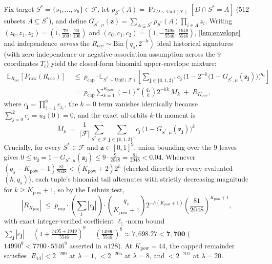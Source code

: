 \documentclass[11pt,a4paper]{article}
\theoremstyle{definition}
\theoremstyle{remark}
\newcommand{\Unif}{\mathrm{Unif}}
\newcommand{\calF}{\mathcal{F}}
\begin{document}
Fix target $S^* = \{s_1, \dots, s_9\} \in \calF$, let $p_{S^*}(A) = \Pr_{D \sim \Unif(\calF)}[D \cap S^* = A]$ ($512$ subsets $A \subseteq S^*$), and define $G_{S^*,\mu}(\mathbf{z}) = \sum_{A \subseteq S^*} p_{S^*}(A) \prod_{i \in A} z_i$. Writing $(z_0, z_1, z_2) = (1, \frac{79}{100}, \frac{20}{100})$ and $(c_0, c_1, c_2) = (1, -\frac{7495}{5546}, \frac{1949}{5546})$, \cref{lem:envelope} and independence \emph{across} the $R_{\mathrm{occ}} \sim \mathrm{Bin}(q_s, 2^{-h})$ ideal historical signatures (with zero independence or negative-association assumption across the $9$ coordinates $T_i$) yield the closed-form binomial upper-envelope mixture:
\begin{align}
\label{eq:exact-binom}
  \mathbb{E}_{R_{\mathrm{occ}}}[P_{\mathrm{raw}}(R_{\mathrm{occ}})]
  &\;\le\; p_{\mathrm{cap}} \cdot \mathbb{E}_{S^* \sim \Unif(\calF)}\!\left[
    \sum_{\mathbf{j} \in \{0,1,2\}^9} c_{\mathbf{j}}\, \Big(1 - 2^{-h}\big(1 - G_{S^*,\mu}(\mathbf{z}_{\mathbf{j}})\big)\Big)^{q_s}
  \right] \nonumber \\
  &\;=\; p_{\mathrm{cap}} \sum_{k=1}^{K_{\mathrm{pow}}} (-1)^k \binom{q_s}{k} 2^{-hk} \, \overline{M}_k \;+\; R_{K_{\mathrm{pow}}},
\end{align}
where $c_{\mathbf{j}} = \prod_{i=1}^9 c_{j_i}$, the $k = 0$ term vanishes identically because $\sum_{j=0}^2 c_j = u_3(0) = 0$, and the exact all-orbits $k$-th moment is
\[
  \overline{M}_k \;=\; \frac{1}{|\calF|} \sum_{S^* \in \calF} \sum_{\mathbf{j} \in \{0,1,2\}^9} c_{\mathbf{j}}\, \big(1 - G_{S^*,\mu}(\mathbf{z}_{\mathbf{j}})\big)^k.
\]
Crucially, for every $S^* \in \calF$ and $\mathbf{z} \in [0, 1]^9$, union bounding over the $9$ leaves gives $0 \le u_{\mathbf{j}} = 1 - G_{S^*,\mu}(\mathbf{z}_{\mathbf{j}}) \le 9 \cdot \frac{9}{2048} = \frac{81}{2048} < 0.04$. Whenever $(q_s - K_{\mathrm{pow}} - 1)\frac{81}{2048} < (K_{\mathrm{pow}} + 2) 2^h$ (checked directly for every evaluated $(h, q_s)$), each tuple's binomial tail alternates with strictly decreasing magnitude for $k \ge K_{\mathrm{pow}} + 1$, so by the Leibniz test,
\[
  |R_{K_{\mathrm{pow}}}| \;\le\; p_{\mathrm{cap}} \cdot \left(\sum_{\mathbf{j}} |c_{\mathbf{j}}|\right) \cdot \binom{q_s}{K_{\mathrm{pow}} + 1} 2^{-h(K_{\mathrm{pow}} + 1)} \left(\frac{81}{2048}\right)^{K_{\mathrm{pow}} + 1},
\]
with exact integer-verified coefficient $\ell_1$-norm bound $\sum_{\mathbf{j}} |c_{\mathbf{j}}| = (1 + \frac{7495 + 1949}{5546})^9 = (\frac{14990}{5546})^9 \approx 7{,}698.27 < \mathbf{7{,}700}$ ($14990^9 < 7700 \cdot 5546^9$ asserted in $u128$). At $K_{\mathrm{pow}} = 44$, the capped remainder satisfies $|R_{44}| < 2^{-299}$ at $\lambda = 1$, $< 2^{-205}$ at $\lambda = 8$, and $< 2^{-201}$ at $\lambda = 20$.
\end{document}
